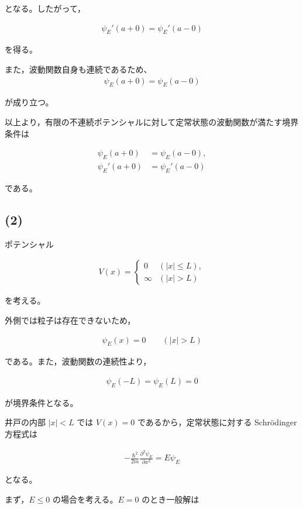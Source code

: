 \documentclass[platex,dvipdfmx,a4paper]{jsarticle}
\newcommand{\nhb}[3]{\frac{\partial^{#1} #2}{\partial #3^{#1}}}
\begin{document}
となる。したがって，

\begin{align*}
\psi_E'(a+0)
=
\psi_E'(a-0)
\end{align*}

を得る。

また，波動関数自身も連続であるため、
\begin{align*}
\psi_E(a+0)
=
\psi_E(a-0)
\end{align*}

が成り立つ。

以上より，有限の不連続ポテンシャルに対して定常状態の波動関数が満たす境界条件は

\begin{align*}
\psi_E(a+0)
&=
\psi_E(a-0),\\
\psi_E'(a+0)
&=
\psi_E'(a-0)
\end{align*}

である。

\subsection*{(2)}

ポテンシャル

\begin{align*}
V(x)
=
\begin{cases}
0 &( |x|\le L),\\
\infty &( |x|>L)
\end{cases}
\end{align*}

を考える。

外側では粒子は存在できないため，

\begin{align*}
\psi_E(x)=0
\qquad
(|x|>L)
\end{align*}

である。また，波動関数の連続性より，

\begin{align*}
\psi_E(-L)=\psi_E(L)=0
\end{align*}

が境界条件となる。

井戸の内部 $|x|<L$ では $V(x)=0$ であるから，定常状態に対する Schr\"odinger 方程式は

\begin{align*}
-\frac{\hbar^2}{2m}\nhb{2}{\psi_E}{x}
=
E\psi_E
\end{align*}

となる。

まず，$E\le0$ の場合を考える。$E=0$ のとき一般解は
\end{document}
